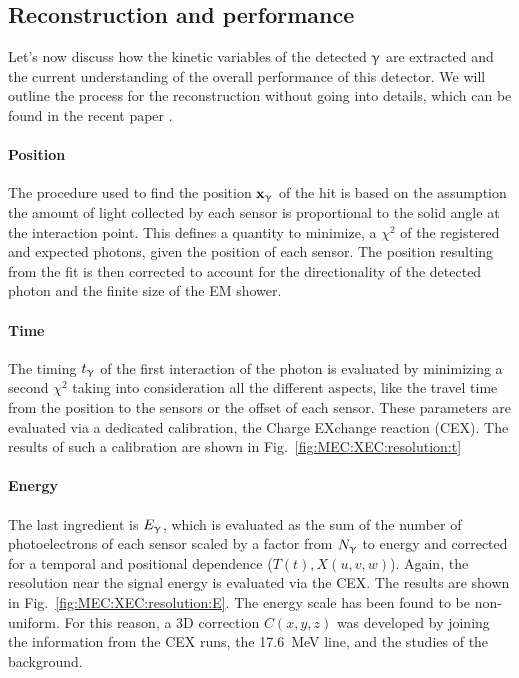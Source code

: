 \begin{refsection}
    \subsection{Reconstruction and performance}
    \label{sec:MEG:XEC:performance}
    Let's now discuss how the kinetic variables of the detected $\upgamma$ are extracted and the current understanding of the overall performance of this detector. 
        We will outline the process for the reconstruction without going into details, which can be found in the recent paper \cite{MEG_II:detector}.
        
        \paragraph{Position} The procedure used to find the position $\textbf{x}_\upgamma$ of the hit is based on the assumption the amount of light collected by each sensor is proportional to the solid angle at the interaction point.
        This defines a quantity to minimize, a $\chi^2$ of the registered and expected photons, given the position of each sensor.   
        The position resulting from the fit is then corrected to account for the directionality of the detected photon and the finite size of the EM shower.

        \paragraph{Time} The timing $t_\upgamma$ of the first interaction of the photon is evaluated by minimizing a second $\chi^2$ taking into consideration all the different aspects, like the travel time from the position to the sensors or the offset of each sensor.
        These parameters are evaluated via a dedicated calibration, the Charge EXchange reaction (CEX).
        The results of such a calibration are shown in Fig.~\ref{fig:MEC:XEC:resolution:t}

        \paragraph{Energy} The last ingredient is $E_\upgamma$, which is evaluated as the sum of the number of photoelectrons of each sensor scaled by a factor from $N_\upgamma$ to energy and corrected for a temporal and positional dependence ($T(t), X(u,v,w)$).
        Again, the resolution near the signal energy is evaluated via the CEX. The results are shown in Fig.~\ref{fig:MEC:XEC:resolution:E}.
        The energy scale has been found to be non-uniform. 
        For this reason, a 3D correction $C(x,y,z)$ was developed by joining the information from the CEX runs, the  \SI{17.6}{MeV} line, and the studies of the background.


\end{refsection}
